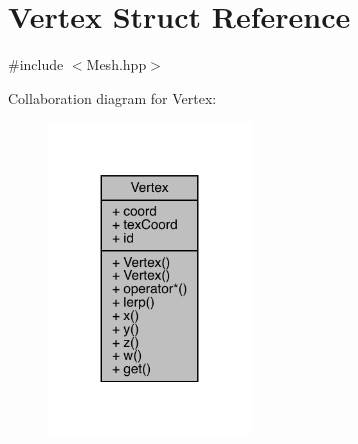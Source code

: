 \hypertarget{struct_vertex}{}\section{Vertex Struct Reference}
\label{struct_vertex}


{\ttfamily \#include $<$Mesh.\+hpp$>$}



Collaboration diagram for Vertex\+:\nopagebreak
\begin{figure}[H]
\begin{center}
\leavevmode
\includegraphics[width=152pt]{struct_vertex__coll__graph}
\end{center}
\end{figure}
